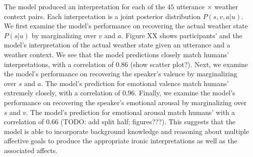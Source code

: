 \documentclass[10pt,letterpaper]{article}
\begin{document}
The model produced an interpretation for each of the $45$ utterance $\times$ weather context pairs. Each interpretation is a joint posterior distribution $P(s, v, a | u)$. We first examine the model's performance on recovering the actual weather state $P(s | u)$ by marginalizing over $v$ and $a$. Figure XX shows participants' and the model's interpretation of the actual weather state given an utterance and a weather context. We see that the model predictions closely match humans' interpretations, with a correlation of $0.86$ (show scatter plot?). Next, we examine the model's performance on recovering the speaker's valence by marginalizing over $s$ and $a$. The model's prediction for emotional valence match humans' extremely closely, with a correlation of $0.96$. Finally, we examine the model's performance on recovering the speaker's emotional arousal by marginalizing over $s$ and $v$. The model's prediction for emotional arousal match humans' with a correlation of $0.66$ (TODO: add split half; figures???). This suggests that the model is able to incorporate background knowledge and reasoning about multiple affective goals to produce the appropriate ironic interpretations as well as the associated affects. 

\begin{figure}[t]
\end{figure}
\end{document}

